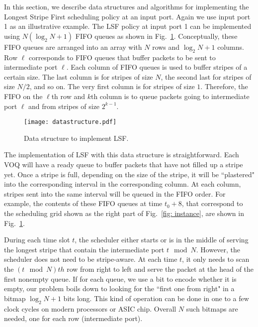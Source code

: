 In this section, we describe data structures and algorithms for implementing the Longest 
Stripe First scheduling policy at an input port.  Again we use input port 1 as an illustrative example.
The LSF policy at input port 1 can be implemented using $N (\log_2 N+1)$ 
FIFO queues as shown in Fig.~\ref{fig:data structure}.  Conceptually, these FIFO queues are arranged into an array with 
$N$ rows and $\log_2 N + 1$ columns.  Row $\ell$ corresponds to FIFO queues that buffer packets 
to be sent to intermediate port $\ell$.  Each column of FIFO queues is used to buffer stripes of a certain size.  
The last column is for stripes of size $N$, the second last for stripes of size $N/2$, and so on.  
The very first column is for stripes of size $1$.  Therefore, the FIFO on the $\ell$th row and $k$th column
is to queue packets going to intermediate port $\ell$ and from stripes of size
$2^{k-1}$.

\begin{figure}[htb]
  \centering
    \texttt{[image: datastructure.pdf]}
    \caption{Data structure to implement LSF.}
\label{fig:data structure}
\end{figure}



The implementation of LSF with this data structure is straightforward.  Each VOQ will have a ready queue 
to buffer packets that have not filled up a stripe yet.  Once a stripe is full, depending on the size of the stripe, 
it will be ``plastered" into the corresponding interval in the corresponding column.  At each column,
stripes sent into the same interval will be queued in the FIFO order.  For example, the contents of 
these FIFO queues at time $t_0+8$, that correspond to the scheduling grid shown as the right part of Fig.~\ref{fig: instance}, 
are shown in Fig.~\ref{fig:data structure}.

During each time slot $t$, the scheduler either starts or is in the middle of serving the longest stripe that contain the intermediate
port $t \mod N$.  However, the scheduler 
does not need to be stripe-aware.  At each time $t$, it only needs to scan the $(t \mod N)th$ row 
from right to left and serve the packet at the head of the first nonempty queue.  If for each queue, we use a bit to encode whether it
is empty, our problem boils down to looking for the ``first one from right" in a bitmap $\log_2 N + 1$ bits long.  This kind of operation
can be done in one to a few clock cycles on modern processors or ASIC chip.  Overall $N$ such bitmaps are needed, one for each 
row (intermediate port).

